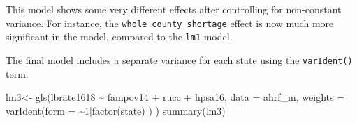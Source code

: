 \documentclass[
]{article}
\newenvironment{Shaded}{\begin{snugshade}}{\end{snugshade}}
\newcommand{\AttributeTok}[1]{\textcolor[rgb]{0.77,0.63,0.00}{#1}}
\newcommand{\DecValTok}[1]{\textcolor[rgb]{0.00,0.00,0.81}{#1}}
\newcommand{\FunctionTok}[1]{\textcolor[rgb]{0.00,0.00,0.00}{#1}}
\newcommand{\NormalTok}[1]{#1}
\newcommand{\OtherTok}[1]{\textcolor[rgb]{0.56,0.35,0.01}{#1}}
\newcommand{\SpecialCharTok}[1]{\textcolor[rgb]{0.00,0.00,0.00}{#1}}
\begin{document}
This model shows some very different effects after controlling for non-constant variance. For instance, the \texttt{whole\ county\ shortage} effect is now much more significant in the model, compared to the \texttt{lm1} model.

The final model includes a separate variance for each state using the \texttt{varIdent()} term.

\begin{Shaded}
\begin{Highlighting}[]
\NormalTok{lm3}\OtherTok{\textless{}{-}} \FunctionTok{gls}\NormalTok{(lbrate1618 }\SpecialCharTok{\textasciitilde{}}\NormalTok{  fampov14 }\SpecialCharTok{+}\NormalTok{ rucc }\SpecialCharTok{+}\NormalTok{ hpsa16,}
          \AttributeTok{data =}\NormalTok{ ahrf\_m, }
          \AttributeTok{weights =} \FunctionTok{varIdent}\NormalTok{(}\AttributeTok{form =} \SpecialCharTok{\textasciitilde{}}\DecValTok{1}\SpecialCharTok{|}\FunctionTok{factor}\NormalTok{(state) ) )}
\FunctionTok{summary}\NormalTok{(lm3)}
\end{Highlighting}
\end{Shaded}
\end{document}
